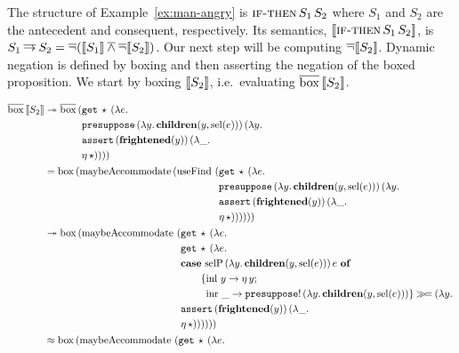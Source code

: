 The structure of Example~\ref{ex:man-angry} is
$\textsc{if-then}\,S_1\,S_2$ where $S_1$ and $S_2$ are the antecedent
and consequent, respectively. Its semantics,
$\llbracket \textsc{if-then}\,S_1\,S_2 \rrbracket$, is
$S_1 \mathbin{\overline{\to}} S_2 = \mathop{\overline{\lnot}} (\llbracket S_1 \rrbracket \mathbin{\overline{\land}} \mathop{\overline{\lnot}} \llbracket S_2 \rrbracket)$. Our next step
will be computing $\mathop{\overline{\lnot}} \llbracket S_2 \rrbracket$. Dynamic negation is defined by boxing
and then asserting the negation of the boxed proposition. We start by
boxing $\llbracket S_2 \rrbracket$, i.e.\ evaluating $\overline{\mathrm{box}}\,\llbracket S_2 \rrbracket$.

\begin{align*}
  \ap{\DBOX}{\sem{S_2}}
  &\tto \ap{\DBOX}{
    \begin{aligned}[t]
      (&\app{\op{get}}{\star}{(\lam{e}{ \\
       &\app{\op{presuppose}}{(\lam{y}{\obj{children}(y, \sel(e))})}{(\lam{y}{ \\
       &\app{\op{assert}}{(\obj{frightened}(y))}{(\lam{\_}{ \\
       &\etaE{\star}})}})}})})
    \end{aligned}} \\
  &= \ap{\BOX}{(\ap{\maybeAccommodate}{(\ap{\useFind}{
    \begin{aligned}[t]
      (&\app{\op{get}}{\star}{(\lam{e}{ \\
       &\app{\op{presuppose}}{(\lam{y}{\obj{children}(y, \sel(e))})}{(\lam{y}{ \\
       &\app{\op{assert}}{(\obj{frightened}(y))}{(\lam{\_}{ \\
       &\etaE{\star}})}})}})})
    ))\end{aligned}}}} \\
  &\tto \ap{\BOX}{(\ap{\maybeAccommodate}{
    \begin{aligned}[t]
      (&\app{\op{get}}{\star}{(\lam{e}{ \\
       &\app{\op{get}}{\star}{(\lam{e}{ \\
       &\casenl{\app{\selP}{(\lam{y}{\obj{children}(y, \sel(e))})}{e}}{y}{\etaE{y}}{\_}{\ap{\op{presuppose}!}{(\lam{y}{\obj{children}(y, \sel(e))})}} \hsbind (\lam{y}{ \\
       &\app{\op{assert}}{(\obj{frightened}(y))}{(\lam{\_}{ \\
       &\etaE{\star}})}})})}})})
    )\end{aligned}}} \\
  &\approx \ap{\BOX}{(\ap{\maybeAccommodate}{
    \begin{aligned}[t]
      (&\app{\op{get}}{\star}{(\lam{e}{ \\
}}
\end{aligned}}}
\end{align*}
